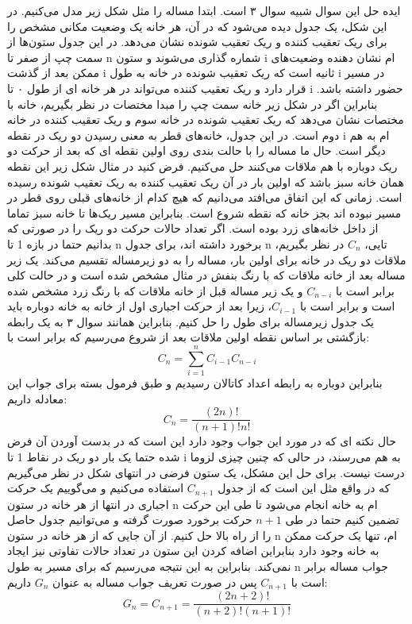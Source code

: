 \p
            ایده حل این سوال شبیه سوال ۳ است. ابتدا مساله را مثل شکل زیر مدل می‌کنیم. در این شکل، یک جدول دیده می‌شود که در آن، هر خانه یک وضعیت مکانی مشخص را برای ریک تعقیب کننده و ریک تعقیب شونده نشان می‌دهد. در این جدول ستون‌ها از سمت چپ از صفر تا n شماره گذاری می‌شوند و ستون i ام نشان دهنده وضعیت‌های ممکن بعد از گذشت i ثانیه است که ریک تعقیب شونده در خانه به طول i در مسیر قرار دارد و ریک تعقیب کننده می‌تواند در هر خانه ای از طول ۰ تا i حضور داشته باشد. بنابراین اگر در شکل زیر خانه سمت چپ را مبدا مختصات در نظر بگیریم، خانه با مختصات  نشان می‌دهد که ریک تعقیب شونده در خانه سوم و ریک تعقیب کننده در خانه دوم است. در این جدول، خانه‌های قطر  به معنی رسیدن دو ریک در نقطه i ام به هم دیگر است. حال ما مساله را با حالت بندی روی اولین نقطه ای که بعد از حرکت دو ریک دوباره با هم ملاقات می‌کنند حل می‌کنیم. فرض کنید در مثال شکل زیر این نقطه همان خانه سبز باشد که اولین بار در آن ریک تعقیب کننده به ریک تعقیب شونده رسیده است. زمانی که این اتفاق می‌افتد می‌دانیم که هیچ کدام از خانه‌های قبلی روی قطر در مسیر نبوده اند بجز خانه  که نقطه شروع است. بنابراین مسیر ریک‌ها تا خانه سبز‌ تماما از داخل خانه‌های زرد بوده است. اگر تعداد حالات حرکت دو ریک را در صورتی که بدانیم حتما در بازه 1 تا n برخورد داشته اند، برای جدول n تایی، \( C_n \) در نظر بگیریم، ملاقات دو ریک در خانه  برای اولین بار، مساله را به دو زیرمساله تقسیم می‌کند. یک زیر مساله بعد از خانه ملاقات که با رنگ بنفش در مثال مشخص شده است و در حالت کلی برابر است با \( C_{n-i} \) و یک زیر مساله قبل از خانه ملاقات که با رنگ زرد مشخص شده است و برابر است با \( C_{i-1} \)، زیرا بعد از حرکت اجباری اول از خانه  به خانه  دوباره باید یک جدول زیرمساله برای طول  را حل کنیم. بنابراین همانند سوال ۳ به یک رابطه بازگشتی بر اساس نقطه اولین ملاقات بعد از شروع می‌رسیم که برابر است با:
            \[ C_n = \sum\limits_{i=1}^{n} C_{i-1}C_{n-i} \]بنابراین دوباره به رابطه اعداد کاتالان رسیدیم و طبق فرمول بسته برای جواب این معادله داریم:
            \[ C_n = \frac{(2n)!}{(n+1)!n!} \]حال نکته ای که در مورد این جواب وجود دارد این است که در بدست آوردن آن فرض شده حتما یک بار دو ریک در نقاط 1 تا i به هم می‌رسند، در حالی که چنین چیزی لزوما درست نیست. برای حل این مشکل، یک ستون فرضی در انتهای شکل در نظر می‌گیریم که در واقع مثل این است که از جدول \( C_{n+1} \) استفاده می‌کنیم و می‌گوییم یک حرکت اجباری در انتها از هر خانه در ستون n ام به خانه  انجام می‌شود تا طی این حرکت تضمین کنیم حتما در طی \( n+1 \) حرکت برخورد صورت گرفته و می‌توانیم جدول حاصل را از راه بالا حل کنیم. از آن جایی که از هر خانه در ستون n ام، تنها یک حرکت ممکن به خانه  وجود دارد بنابراین اضافه کردن این ستون در تعداد حالات تفاوتی نیز ایجاد نمی‌کند. بنابراین به این نتیجه می‌رسیم که برای مسیر به طول n جواب مساله برابر است با \( C_{n+1} \) پس در صورت تعریف جواب مساله به عنوان \( G_n \) داریم:
            \[ G_n = C_{n+1} = \frac{(2n+2)!}{(n+2)!(n+1)!} \]
            \p 
